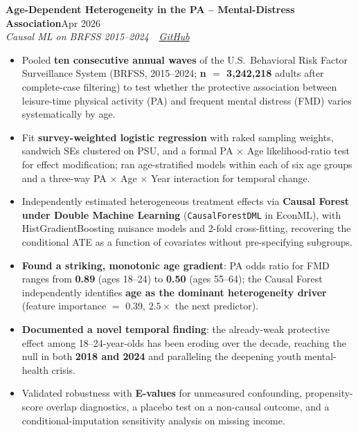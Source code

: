 \documentclass[11pt,letterpaper]{article}
\newcommand{\entry}[4]{%
  \noindent\textbf{\color{ink}#1}\hfill{\color{soft}\small #3}\\[1pt]%
  \textit{\color{muted}#2}\hfill\textit{\color{soft}\small #4}%
  \vspace{2pt}%
}
\begin{document}
\vspace{4pt}
\entry{Age-Dependent Heterogeneity in the PA -- Mental-Distress Association}{Causal ML on BRFSS 2015--2024 \,\textbar\, \href{https://github.com/cedricshan/pa-fmd-hte}{GitHub}}{Apr 2026}{}
\begin{itemize}
  \item Pooled \textbf{ten consecutive annual waves} of the U.S.\ Behavioral Risk Factor Surveillance System (BRFSS, 2015--2024; \textbf{n $=$ 3{,}242{,}218} adults after complete-case filtering) to test whether the protective association between leisure-time physical activity (PA) and frequent mental distress (FMD) varies systematically by age.
  \item Fit \textbf{survey-weighted logistic regression} with raked sampling weights, sandwich SEs clustered on PSU, and a formal PA $\times$ Age likelihood-ratio test for effect modification; ran age-stratified models within each of six age groups and a three-way PA $\times$ Age $\times$ Year interaction for temporal change.
  \item Independently estimated heterogeneous treatment effects via \textbf{Causal Forest under Double Machine Learning} (\texttt{CausalForestDML} in EconML), with HistGradientBoosting nuisance models and 2-fold cross-fitting, recovering the conditional ATE as a function of covariates without pre-specifying subgroups.
  \item \textbf{Found a striking, monotonic age gradient}: PA odds ratio for FMD ranges from \textbf{0.89} (ages 18--24) to \textbf{0.50} (ages 55--64); the Causal Forest independently identifies \textbf{age as the dominant heterogeneity driver} (feature importance $=$ 0.39, $2.5\times$ the next predictor).
  \item \textbf{Documented a novel temporal finding}: the already-weak protective effect among 18--24-year-olds has been eroding over the decade, reaching the null in both \textbf{2018 and 2024} and paralleling the deepening youth mental-health crisis.
  \item Validated robustness with \textbf{E-values} for unmeasured confounding, propensity-score overlap diagnostics, a placebo test on a non-causal outcome, and a conditional-imputation sensitivity analysis on missing income.
\end{itemize}
\end{document}
